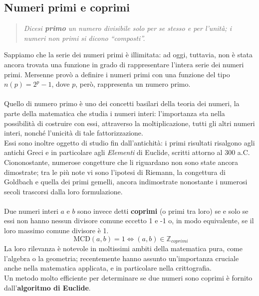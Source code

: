 \documentclass[a4paper,12pt]{article}
\begin{document}
\subsection{Numeri primi e coprimi}
\begin{quote}
    \emph{Dicesi \textbf{primo} un numero divisibile solo per se stesso e per l'unità; i numeri non primi si dicono ``composti''.}
\end{quote}
Sappiamo che la serie dei numeri primi è illimitata: ad oggi, tuttavia, non è stata ancora trovata una funzione in grado di rappresentare l'intera serie dei numeri primi. Mersenne provò a definire i numeri primi con una funzione del tipo $n(p) = 2^{p}-1$, dove $p$, però, rappresenta un numero primo.\\\\
Quello di numero primo è uno dei concetti basilari della teoria dei numeri, la parte della matematica che studia i numeri interi: l'importanza sta nella possibilità di costruire con essi, attraverso la moltiplicazione, tutti gli altri numeri interi, nonché l'unicità di tale fattorizzazione.\\
Essi sono inoltre oggetto di studio fin dall'antichità: i primi risultati risalgono agli antichi Greci e in particolare agli \emph{Elementi} di Euclide, scritti attorno al 300 a.C. Ciononostante, numerose congetture che li riguardano non sono state ancora dimostrate; tra le più note vi sono l'ipotesi di Riemann, la congettura di Goldbach e quella dei primi gemelli, ancora indimostrate nonostante i numerosi secoli trascorsi dalla loro formulazione.\\\\
Due numeri interi $a$ e $b$ sono invece detti \textbf{coprimi} (o primi tra loro) se e solo se essi non hanno nessun divisore comune eccetto 1 e -1 o, in modo equivalente, se il loro massimo comune divisore è 1.
\begin{equation}\label{coprimi}
\text{ MCD}(a,b)=1 \iff (a,b) \in \mathbb{Z}_{coprimi}
\end{equation}
La loro rilevanza è notevole in moltissimi ambiti della matematica pura, come l'algebra o la geometria; recentemente hanno assunto un'importanza cruciale anche nella matematica applicata, e in particolare nella crittografia.\\
Un metodo molto efficiente per determinare se due numeri sono coprimi è fornito dall'\textbf{algoritmo di Euclide}.
\end{document}
